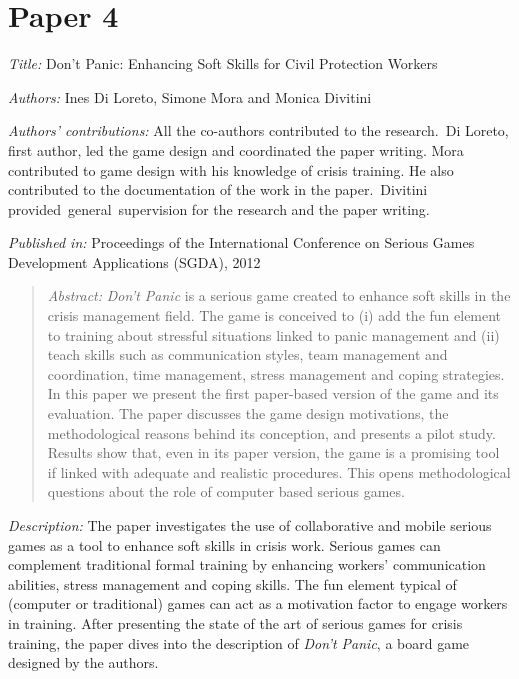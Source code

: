 \section[P4: Don't Panic: Enhancing Soft Skills for Civil Protection Workers]{Paper 4}\label{paper-4}

\emph{Title:} Don't Panic: Enhancing Soft Skills for Civil Protection Workers

\emph{Authors:} Ines Di Loreto, Simone Mora and Monica Divitini

\emph{Authors' contributions:} All the co-authors contributed to the research.~Di Loreto, first author, led the game design and coordinated the paper writing. Mora contributed to game design with his knowledge of crisis training. He also contributed to the documentation of the work in the paper.~Divitini provided~general~supervision for the research and the paper writing.

\emph{Published in:} Proceedings of the International Conference on Serious Games Development Applications (SGDA), 2012 
\begin{quote}
	\emph{Abstract:} \emph{Don't Panic} is a serious game created to enhance soft skills in the crisis management field. The game is conceived to (i) add the fun element to training about stressful situations linked to panic management and (ii) teach skills such as communication styles, team management and coordination, time management, stress management and coping strategies. In this paper we present the first paper-based version of the game and its evaluation. The paper discusses the game design motivations, the methodological reasons behind its conception, and presents a pilot study. Results show that, even in its paper version, the game is a promising tool if linked with adequate and realistic procedures. This opens methodological questions about the role of computer based serious games. 
\end{quote}

\emph{Description:} The paper investigates the use of collaborative and mobile serious games as a tool to enhance soft skills in crisis work. Serious games can complement traditional formal training by enhancing workers' communication abilities, stress management and coping skills. The fun element typical of (computer or traditional) games can act as a motivation factor to engage workers in training. After presenting the state of the art of serious games for crisis training, the paper dives into the description of \emph{Don't Panic}, a board game designed by the authors. 

